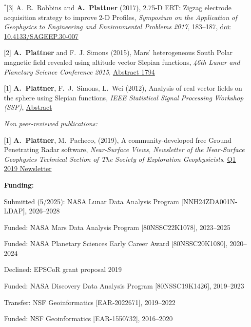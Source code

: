 \documentclass[10pt]{article}
\begin{document}
\spcp
\hspace{-0.67cm}$^*$[3] A.~R.~Robbins and \textbf{A.~Plattner}
(2017),
2.75-D ERT: Zigzag electrode acquisition strategy to improve 2-D
Profiles,
\emph{Symposium on the Application of Geophysics to Engineering and
  Environmental Problems 2017}, 183--187,
\href{http://library.seg.org/doi/pdf/10.4133/SAGEEP.30-007}{doi: 10.4133/SAGEEP.30-007}

\spcp
\hspace{-0.5cm}[2] \textbf{A.~Plattner} and F.~J. Simons (2015),
Mars' heterogeneous South Polar magnetic field revealed using altitude vector Slepian functions,
\emph{46th Lunar and Planetary Science Conference 2015},
\href{http://www.hou.usra.edu/meetings/lpsc2015/pdf/1794.pdf}{Abstract 1794}

\spcp
\hspace{-0.5cm}[1] \textbf{A.~Plattner}, F.~J.~Simons, L.~Wei (2012),
Analysis of real vector fields on the sphere using Slepian functions,
\emph{IEEE Statistical Signal Processing Workshop (SSP)},
\href{http://ieeexplore.ieee.org/stamp/stamp.jsp?tp=&arnumber=6319659}{Abstract}

\spc
\emph{Non peer-reviewed publications:}

\spcp
\hspace{-0.5cm}[1] \textbf{A.~Plattner}, M.~Pacheco, (2019), A
community-developed free Ground Penetrating Radar software,
\emph{Near-Surface Views, Newsletter of the Near-Surface Geophysics
  Technical Section of The Society of Exploration Geophysicists},
\href{https://seg.org/Portals/0/SEG/News%20and%20Resources/Near%20Surface/Near%20Surface%20Newsletter/2011-present/2019_Q1.pdf}{Q1
  2019 Newsletter}


\clearpage
\textbf{\tsize Funding:}

\spcp
Submitted (5/2025): NASA Lunar Data Analysis Program [NNH24ZDA001N-LDAP], 2026--2028

\spcp
Funded: NASA Mars Data Analysis Program [80NSSC22K1078], 2023--2025

\spcp
Funded: NASA Planetary Sciences Early Career Award [80NSSC20K1080], 2020--2024

\spcp Declined: EPSCoR grant proposal 2019

\spcp
Funded: NASA Discovery Data Analysis Program [80NSSC19K1426], 2019--2023

\spcp
Transfer: NSF Geoinformatics [EAR-2022671], 2019--2022 

\spcp
  Funded: NSF Geoinformatics
  [EAR-1550732],
  2016--2020
\end{document}
